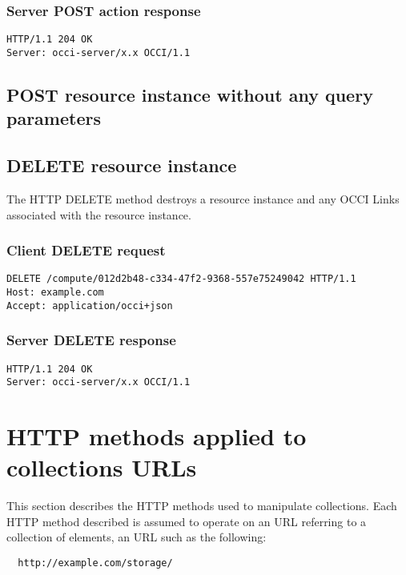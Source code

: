 \documentclass[10pt,a4paper]{article}
\begin{document}
\subsubsection{Server POST action response}

\begin{verbatim}
HTTP/1.1 204 OK
Server: occi-server/x.x OCCI/1.1
\end{verbatim}

\subsection{POST resource instance without any query parameters}

\subsection{DELETE resource instance}
The HTTP DELETE method destroys a resource instance and any OCCI Links
associated with the resource instance.

\subsubsection{Client DELETE request}
\begin{verbatim}
DELETE /compute/012d2b48-c334-47f2-9368-557e75249042 HTTP/1.1
Host: example.com
Accept: application/occi+json
\end{verbatim}

\subsubsection{Server DELETE response}
\begin{verbatim}
HTTP/1.1 204 OK
Server: occi-server/x.x OCCI/1.1
\end{verbatim}


\section{HTTP methods applied to collections URLs}
This section describes the HTTP methods used to manipulate collections. Each
HTTP method described is assumed to operate on an URL referring to a collection
of elements, an URL such as the following:
\begin{verbatim}
  http://example.com/storage/
\end{verbatim}
\end{document}
